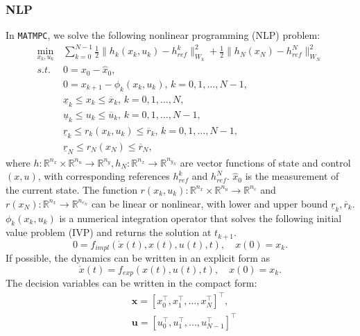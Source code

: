 \documentclass{article}
\newcommand{\software}[1]{{\tt#1}}
\newcommand{\norm}[1]{\lVert#1\rVert}
\begin{document}
\subsubsection{NLP}
In \software{MATMPC}, we solve the following nonlinear programming (NLP) problem:
\begin{equation}\label{NLP}
	\begin{aligned}
	\min_{x_k,u_k} \,&\sum_{k=0}^{N-1} \frac{1}{2}\norm{h_k(x_k,u_k)-h_{ref}^k}_{W_k}^2+\frac{1}{2}\norm{h_N(x_N)-h_{ref}^N}_{W_N}^2\\
	s.t.\, &0=x_0-\hat{x}_0,\\
	&0=x_{k+1}-\phi_k(x_k,u_k),\, k=0,1,\ldots,N-1,\\
	&\underline{x}_k\leq x_k\leq \overline{x}_k,\,k=0,1,\ldots,N,\\
	&\underline{u}_k\leq u_k\leq \overline{u}_k,\,k=0,1,\ldots,N-1,\\
	&\underline{r}_k\leq r_k(x_k,u_k)\leq \overline{r}_k, \,k=0,1,\ldots,N-1,\\
	&\underline{r}_N\leq r_N(x_N)\leq \overline{r}_N,
	\end{aligned}
\end{equation}
where $h:\mathbb{R}^{n_x}\times\mathbb{R}^{n_u}\rightarrow \mathbb{R}^{n_y},h_N:\mathbb{R}^{n_x}\rightarrow\mathbb{R}^{n_{y_N}}$ are vector functions of state and control $(x,u)$, with corresponding references $h_{ref}^k$ and $h_{ref}^N$. $\hat{x}_0$ is the measurement of the current state. The function $r(x_k,u_k): \mathbb{R}^{n_x}\times\mathbb{R}^{n_u} \rightarrow \mathbb{R}^{n_c}$ and $r(x_N): \mathbb{R}^{n_x}\rightarrow \mathbb{R}^{n_{c_N}}$ can be linear or nonlinear, with lower and upper bound $\underline{r}_k, \overline{r}_k$. $\phi_k(x_k,u_k)$ is a numerical integration operator that solves the following initial value problem (IVP) and returns the solution at $t_{k+1}$.
\begin{equation}
0=f_{impl}(\dot{x}(t), x(t),u(t),t),\quad x(0)=x_k.
\end{equation}
If possible, the dynamics can be written in an explicit form as
\begin{equation}
\dot{x}(t)=f_{exp}(x(t),u(t),t),\quad x(0)=x_k.
\end{equation}
The decision variables can be written in the compact form:
\begin{equation}
\begin{aligned}
&\mathbf{x}= \left [x_0^\top, x_1^\top,\dots, x_N^\top\right ]^\top,\\
&\mathbf{u}= \left [u_0^\top, u_1^\top,\dots, u_{N-1}^\top\right ]^\top
\end{aligned}
\end{equation}
\end{document}
